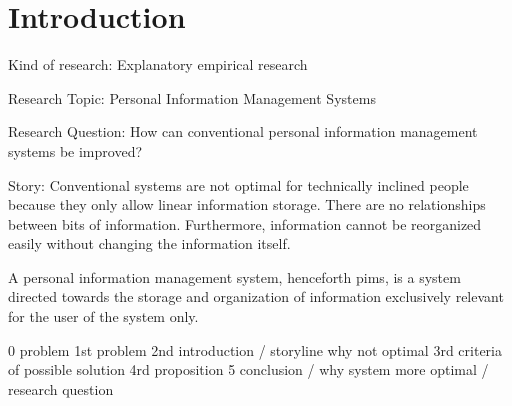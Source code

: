 \section{Introduction}

Kind of research: Explanatory empirical research

Research Topic: Personal Information Management Systems

Research Question: How can conventional personal information management systems be improved?

Story: Conventional systems are not optimal for technically inclined people because they only allow linear information storage.
There are no relationships between bits of information. Furthermore, information cannot be reorganized easily without changing the information itself.

A personal information management system, henceforth \gls{pims}, is a system
directed towards the storage and organization of information exclusively
relevant for the user of the system only.

0 problem
1st problem
2nd introduction / storyline why not optimal
3rd criteria of possible solution
4rd proposition
5 conclusion / why system more optimal / research question
